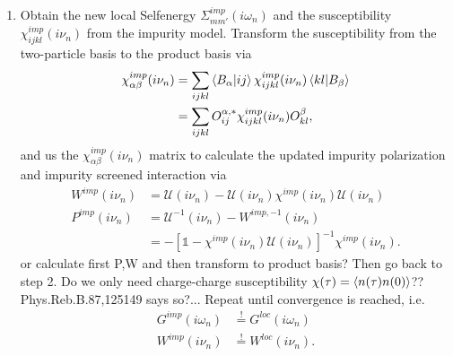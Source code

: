 \documentclass[12pt,a4paper]{scrartcl}
\numberwithin{equation}{section}
\newcommand{\cng}[1]{{\color{red}#1}}
\newcommand{\GF}{Green's function}
\newcommand{\unity}{\mathds{1}}
\begin{document}
\begin{enumerate}
\item Obtain the new local Selfenergy $\Sigma^{imp}_{mm'}(i\omega_n)$ and the
susceptibility $\chi^{imp}_{ijkl}(i\nu_n)$ from the impurity model.
Transform the susceptibility from the two-particle basis to the product basis via
\begin{align}
\chi^{imp}_{\alpha\beta}(i\nu_n)
&= \sum_{ijkl} \braket{B_{\alpha}|ij} \chi^{imp}_{ijkl}(i\nu_n) \braket{kl|B_{\beta}} \\
&= \sum_{ijkl} O^{\alpha,*}_{ij} \chi^{imp}_{ijkl}(i\nu_n) O^{\beta}_{kl} ,
\end{align}
and us the $\chi^{imp}_{\alpha\beta}(i\nu_n)$ matrix to calculate the updated impurity polarization 
and impurity screened interaction via 
\begin{align}
W^{imp}(i\nu_n) &=  \mathcal{U}(i\nu_n) - \mathcal{U}(i\nu_n)\chi^{imp}(i\nu_n) \mathcal{U}(i\nu_n) \\
P^{imp}(i\nu_n) &= \mathcal{U}^{-1}(i\nu_n) - W^{imp,-1}(i\nu_n) \nonumber\\
&= -[\unity - \chi^{imp}(i\nu_n)\mathcal{U}(i\nu_n)]^{-1}\chi^{imp}(i\nu_n) .
\end{align}
\cng{or calculate first P,W and then transform to product basis?}
Then go back to step 2. 
\cng{Do we only need charge-charge susceptibility $\chi(\tau)=\braket{n(\tau)n(0)}$?? Phys.Reb.B.87,125149
says so?...}
Repeat until convergence is reached, i.e.
\begin{align}
G^{imp}(i\omega_n) &\stackrel{!}{=} G^{loc}(i\omega_n) \\
W^{imp}(i\nu_n) &\stackrel{!}{=} W^{loc}(i\nu_n) .
\end{align}

\end{enumerate}
\end{document}
